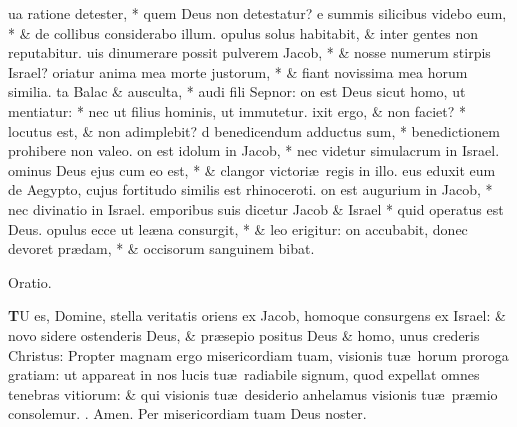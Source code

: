\documentclass[letter,11pt]{book}
\makeatletter
\DeclareRobustCommand{\Rbar}{\vers@resp{0pt}{R}}
\newcommand{\vers@resp@sym}{\raisebox{0.2ex}{\rotatebox[origin=c]{-20}{$\m@th\rceil$}}}
\newcommand{\vers@resp}[2]{%
  {\ooalign{\hidewidth\kern#1\vers@resp@sym\hidewidth\cr#2\cr}}%
}%
\def\R{\color{Red} \Rbar . \color{black}}
\makeatother
\begin{document}
\begin{multicols*}{2}
ua ratione detester, * quem Deus non detestatur?
e summis silicibus videbo eum, * \& de collibus considerabo illum.
opulus solus habitabit, \& inter gentes non reputabitur.
uis dinumerare possit pulverem Jacob, * \& nosse numerum stirpis Israel?
oriatur anima mea morte justorum, * \&
fiant novissima mea horum similia.
ta Balac \& ausculta, * audi fili Sepnor:
on est Deus sicut homo, ut mentiatur: * nec ut filius hominis, ut immutetur.
ixit ergo, \& non faciet? * locutus est, \& non adimplebit?
d benedicendum adductus sum, * benedictionem prohibere non valeo.
on est idolum in Jacob, * nec videtur simulacrum in Israel.
ominus Deus ejus cum eo est, * \& clangor victori\ae \ regis in illo.
eus eduxit eum de Aegypto, cujus fortitudo similis est rhinoceroti.
on est augurium in Jacob, * nec divinatio in Israel.
emporibus suis dicetur Jacob \& Israel * quid operatus est Deus.
opulus ecce ut le\ae na consurgit, * \& leo erigitur:
on accubabit, donec devoret pr\ae dam, * \& occisorum sanguinem bibat.
\vspace{-.5em} \begin{center} \color{Red} Oratio. \color{black} \end{center} \vspace{-.5em}
\lettrine[lines=2]{\bfseries \color{Red} T}{}U es, Domine, stella veritatis oriens ex Jacob, homoque consurgens ex Israel: \& novo sidere ostenderis Deus, \& pr\ae sepio positus Deus \& homo, unus crederis Christus: Propter magnam ergo misericordiam tuam, visionis tu\ae \ horum proroga gratiam: ut appareat in nos lucis tu\ae \ radiabile signum, quod expellat omnes tenebras vitiorum: \& qui visionis tu\ae \ desiderio anhelamus visionis tu\ae \ pr\ae mio consolemur. \R Amen. Per misericordiam tuam Deus noster.

\end{multicols*}
\end{document}
